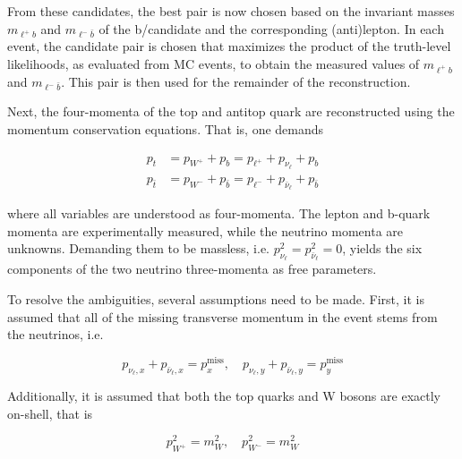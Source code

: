 From these candidates, the best pair is now chosen based on the invariant masses $m_{\ell^+ b}$ and $m_{\ell^- \bar{b}}$ of the b/\bbar candidate and the corresponding (anti)lepton. In each event, the candidate pair is chosen that maximizes the product of the truth-level likelihoods, as evaluated from MC events, to obtain the measured values of $m_{\ell^+ b}$ and $m_{\ell^- \bar{b}}$. This pair is then used for the remainder of the reconstruction.

Next, the four-momenta of the top and antitop quark are reconstructed using the momentum conservation equations. That is, one demands

\begin{equation}
\begin{split}
    p_t &= p_{W^+} + p_{b} = p_{\ell^+} + p_{\nu_{\ell}} + p_{b} \\
    p_{\bar{t}} &= p_{W^-} + p_{\bar{b}} = p_{\ell^-} + p_{\bar{\nu}_{\ell}} + p_{\bar{b}}
\end{split}
\end{equation}

where all variables are understood as four-momenta. The lepton and b-quark momenta are experimentally measured, while the neutrino momenta are unknowns. Demanding them to be massless, i.e. $p_{\nu_{\ell}}^2 = p_{\bar{\nu}_{\ell}}^2 = 0$, yields the six components of the two neutrino three-momenta as free parameters.

To resolve the ambiguities, several assumptions need to be made. First, it is assumed that all of the missing transverse momentum in the event stems from the neutrinos, i.e.

\begin{equation}
    p_{\nu_{\ell},x} + p_{\bar{\nu}_{\ell},x} = p_{x}^{\mathrm{miss}} , \quad p_{\nu_{\ell},y} + p_{\bar{\nu}_{\ell},y} = p_{y}^{\mathrm{miss}}
\end{equation}

Additionally, it is assumed that both the top quarks and W bosons are exactly on-shell, that is

\begin{equation}
    p_{W^+}^2 = m_W^2 , \quad p_{W^-}^2 = m_W^2
\end{equation}

